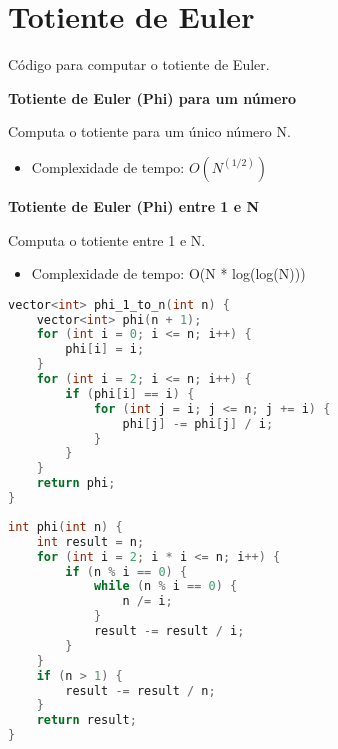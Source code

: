 \documentclass[11pt, a4paper, oneside]{book}
\begin{document}
\hfill

\section{Totiente de Euler}


Código para computar o totiente de Euler.



\textbf{Totiente de Euler (Phi) para um número} 

Computa o totiente para um único número N.



\begin{itemize}
\item Complexidade de tempo: $O(N^(1/2))$
\end{itemize}



\textbf{Totiente de Euler (Phi) entre 1 e N} 

Computa o totiente entre 1 e N.



\begin{itemize}
\item Complexidade de tempo: O(N * log(log(N)))
\end{itemize}

\hfill

\begin{multicols}{2}
\begin{lstlisting}[language=C++]
vector<int> phi_1_to_n(int n) {
    vector<int> phi(n + 1);
    for (int i = 0; i <= n; i++) {
        phi[i] = i;
    }
    for (int i = 2; i <= n; i++) {
        if (phi[i] == i) {
            for (int j = i; j <= n; j += i) {
                phi[j] -= phi[j] / i;
            }
        }
    }
    return phi;
}
\end{lstlisting}
\end{multicols}

\hfill

\begin{multicols}{2}
\begin{lstlisting}[language=C++]
int phi(int n) {
    int result = n;
    for (int i = 2; i * i <= n; i++) {
        if (n % i == 0) {
            while (n % i == 0) {
                n /= i;
            }
            result -= result / i;
        }
    }
    if (n > 1) {
        result -= result / n;
    }
    return result;
}
\end{lstlisting}
\end{multicols}
\end{document}
